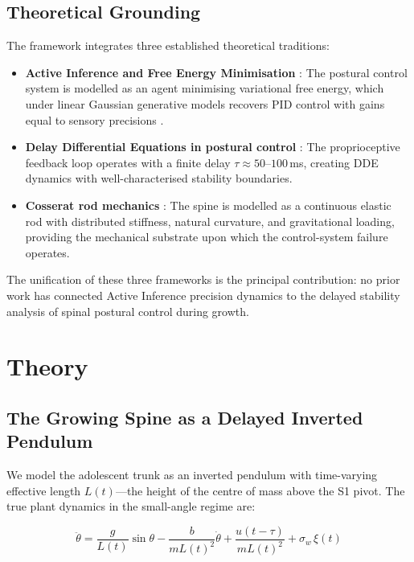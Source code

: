 \documentclass[12pt, letterpaper]{article}
\begin{document}
\subsection{Theoretical Grounding}

The framework integrates three established theoretical traditions:

\begin{itemize}
  \item \textbf{Active Inference and Free Energy Minimisation}
    \citep{Friston2010, FristonFEP2019}: The postural control system is modelled
    as an agent minimising variational free energy, which under linear Gaussian
    generative models recovers PID control with gains equal to sensory precisions
    \citep{Baltieri2019}.

  \item \textbf{Delay Differential Equations in postural control}
    \citep{Insperger2011, Peterka2002, Insperger2013}: The proprioceptive
    feedback loop operates with a finite delay $\tau \approx 50$--$100$\,ms,
    creating DDE dynamics with well-characterised stability boundaries.

  \item \textbf{Cosserat rod mechanics} \citep{Antman2005, Stokes2006}: The
    spine is modelled as a continuous elastic rod with distributed stiffness,
    natural curvature, and gravitational loading, providing the mechanical
    substrate upon which the control-system failure operates.
\end{itemize}

The unification of these three frameworks is the principal contribution:
no prior work has connected Active Inference precision dynamics to the
delayed stability analysis of spinal postural control during growth.

\section{Theory}

\subsection{The Growing Spine as a Delayed Inverted Pendulum}

We model the adolescent trunk as an inverted pendulum with time-varying
effective length $L(t)$---the height of the centre of mass above the S1 pivot.
The true plant dynamics in the small-angle regime are:

\begin{equation}
  \ddot{\theta} = \frac{g}{L(t)}\sin\theta
    - \frac{b}{mL(t)^{2}}\dot{\theta}
    + \frac{u(t-\tau)}{mL(t)^{2}}
    + \sigma_w\,\xi(t)
  \label{eq:plant}
\end{equation}
\end{document}
